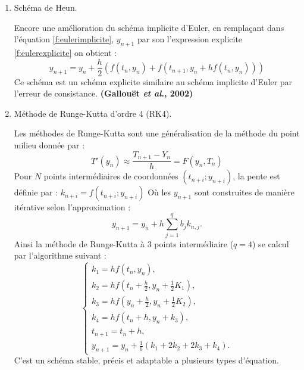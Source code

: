 \documentclass[12pt, oneside]{report} %
\theoremstyle{definition}
\theoremstyle{remark}
\begin{document}
\begin{enumerate}
		\item {Schéma de Heun}.\

		Encore une amélioration du schéma implicite d'Euler, en remplaçant dans l'équation \eqref{f:eulerimplicite}, $y_{n+1}$ par son l'expression explicite \eqref{f:eulerexplicite} on obtient : \begin{equation}
			y_{n+1} = y_n + \frac{h}{2}(f(t_n, y_n) + f(t_{n+1}, y_n + hf(t_n, y_n)))
		\end{equation}
		Ce schéma est un schéma explicite similaire au schéma implicite d'Euler par l'erreur de consistance. \textbf{(Gallouët \textit{et al}., 2002)}
		
		\item {Méthode de  Runge-Kutta d'ordre 4 (RK4)}.\
		
	Les méthodes de Runge-Kutta sont une généralisation de la méthode du point milieu donnée par : \begin{equation}
		T'(y_n) \approx \frac{T_{n+1} - Y_n }{h}= F (y_n, T_n)
	\end{equation}
	Pour $N$ points intermédiaires de coordonnées $(t_{n+i}; y_{n+i})$, la pente est définie par : $	k_{n+i} = f(t_{n+i};y_{n+i})$
	Où les $y_{n+1} $ sont construites de manière itérative selon l'approximation :
	\begin{equation}
		y_{n+1} = y_{n} + h\sum_{j=1}^{q}b_{j}k_{n,j}.
	\end{equation}
	Ainsi la méthode de Runge-Kutta à 3 points intermédiaire ($q=4$) se calcul par l'algorithme suivant : 
		\begin{equation}
			\begin{cases}
				k_1= h f(t_n, y_n), \\  
				k_2 = h f(t_n +\frac{ h}{2}, y_n + \frac{1}{2}K_1), \\  
				k_3 = h f(y_n +\frac{ h}{2}, y_n + \frac{1}{2}K_2), \\  
				k_4 = h f(t_n + h, y_n + k_3), \\  
				t_{n+1} = t_n + h, \\ 
				y_{n+1} = y_n + \frac{1}{6}(k_1 + 2k_2 + 2k_3 + k_4).
			\end{cases}
		\end{equation}  
		C'est un schéma stable, précis et adaptable a plusieurs types d'équation.
	\end{enumerate}
\end{document}
